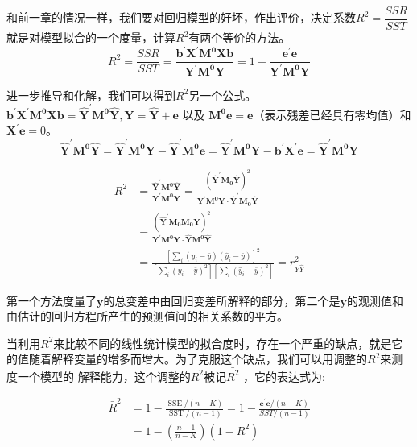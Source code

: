   和前一章的情况一样，我们要对回归模型的好坏，作出评价，决定系数$ R^{2} = \dfrac{SSR}{SST}$就是对模型拟合的一个度量，计算$ R^{2} $有两个等价的方法。
  $$ R^{2}=\frac{S S R}{S S T}=\frac{ \boldsymbol{b^{\prime} X^{\prime} M^{0} X b}} { \boldsymbol{Y^{\prime} M^{0} Y}} 
             =1-\frac{\boldsymbol{e^{\prime} e}}{\boldsymbol{Y^{\prime} M^{0} Y}} $$

  进一步推导和化解，我们可以得到$ R^{2} $另一个公式。
 $ \boldsymbol{b^{\prime} X^{\prime} M^{0} X b} = \boldsymbol{\hat{Y}^{\prime} M^{0} \hat{Y}}, \boldsymbol{Y=\hat{Y}+e} $
 以及 $ \boldsymbol{M^{0}e = e} $（表示残差已经具有零均值）和 $ \boldsymbol{X^{\prime} e}=0 $。
 $$ \boldsymbol{\hat{Y}^{\prime} M^{0} \hat{Y}} = \boldsymbol{\hat{Y}^{\prime} M^{0} Y-\hat{Y}^{\prime} M^{0} e}
                = \boldsymbol{\hat{Y}^{\prime} M^{0} Y-b^{\prime} X^{\prime} e}=\boldsymbol{\hat{Y}^{\prime} M^{0} Y} $$

$$\begin{aligned}
    R^{2} &=\frac{\boldsymbol{\hat{Y}^{\prime} M^{0} \hat{Y}}}{\boldsymbol{Y^{\prime} M^{0} Y}}
    =\frac{\left( \boldsymbol{\hat{Y}^{\prime} M_{0} \hat{Y}}\right)^{2}}{\boldsymbol{Y^{\prime} M^{0} Y \cdot \hat{Y}^{\prime} M_{0} \hat{Y}}} \\
    &=\frac{\left(\boldsymbol{\hat{Y}^{\prime} M_{0} M_{0} Y}\right)^{2}}{\boldsymbol{Y^{\prime} M^{0} Y \cdot \hat{Y} M^{0} \hat{Y}}} \\
    & =\frac{\left[\sum_{i}\left(y_{i}-\bar{y}\right)\left(\hat{y}_{i}-\bar{y}\right)\right]^{2}}
    {\left[\sum_{i}\left(y_{i}-\bar{y}\right)^{2}\right] \left[  \sum_{i}\left(\hat{y}_{i}-\bar{y}\right)^{2}\right]}=r_{Y \hat{Y}}^{2}
  \end{aligned}$$

  第一个方法度量了$ \boldsymbol{y} $的总变差中由回归变差所解释的部分，第二个是$ \boldsymbol{y} $的观测值和由估计的回归方程所产生的预测值间的相关系数的平方。

  当利用$ R^{2} $来比较不同的线性统计模型的拟合度时，存在一个严重的缺点，就是它的值随着解释变量的增多而增大。为了克服这个缺点，我们可以用调整的$ R^{2} $来测度一个模型的
  解释能力，这个调整的$ R^{2} $被记$ \bar{R^{2}} $ ，它的表达式为:

  $$ \begin{aligned}
    \bar{R}^{2} &=1-\frac{\operatorname{SSE} /(n-K)}{\operatorname{SST} /(n-1)}=1-\frac{\boldsymbol{e^{\prime} e} /(n-K)}{S S T /(n-1)} \\
    &=1-\left(\frac{n-1}{n-K}\right)\left(1-R^{2}\right)
    \end{aligned} $$

